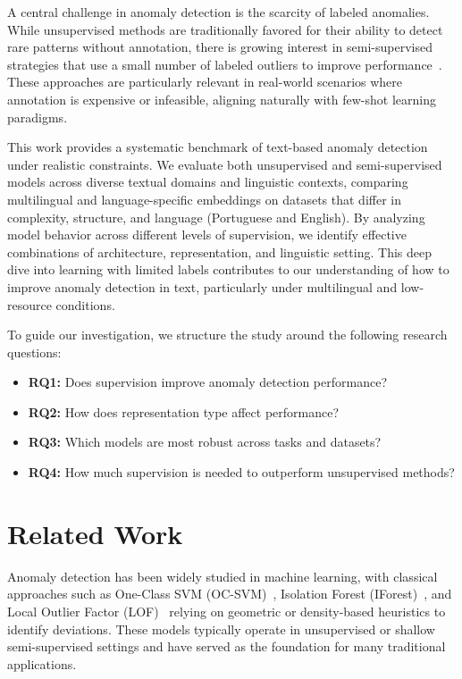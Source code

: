 \documentclass[12pt]{article}
\begin{document}
A central challenge in anomaly detection is the scarcity of labeled anomalies. While unsupervised methods are traditionally favored for their ability to detect rare patterns without annotation, there is growing interest in semi-supervised strategies that use a small number of labeled outliers to improve performance~\cite{pang2021deep, xu-etal-2023-comparative}. These approaches are particularly relevant in real-world scenarios where annotation is expensive or infeasible, aligning naturally with few-shot learning paradigms.

This work provides a systematic benchmark of text-based anomaly detection under realistic constraints. We evaluate both unsupervised and semi-supervised models across diverse textual domains and linguistic contexts, comparing multilingual and language-specific embeddings on datasets that differ in complexity, structure, and language (Portuguese and English). By analyzing model behavior across different levels of supervision, we identify effective combinations of architecture, representation, and linguistic setting. This deep dive into learning with limited labels contributes to our understanding of how to improve anomaly detection in text, particularly under multilingual and low-resource conditions.

To guide our investigation, we structure the study around the following research questions:

\begin{itemize}
    \item \textbf{RQ1:} Does supervision improve anomaly detection performance?
    \item \textbf{RQ2:} How does representation type affect performance?
    \item \textbf{RQ3:} Which models are most robust across tasks and datasets?
    \item \textbf{RQ4:} How much supervision is needed to outperform unsupervised methods?
\end{itemize}


\section{Related Work}

Anomaly detection has been widely studied in machine learning, with classical approaches such as One-Class SVM (OC-SVM)~\cite{OCSVM}, Isolation Forest (IForest)~\cite{IForest}, and Local Outlier Factor (LOF)~\cite{LOF} relying on geometric or density-based heuristics to identify deviations. These models typically operate in unsupervised or shallow semi-supervised settings and have served as the foundation for many traditional applications.
\end{document}

